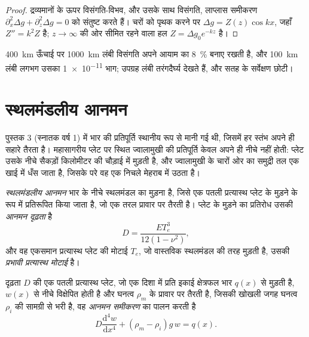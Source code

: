 \begin{proof}
द्रव्यमानों के ऊपर विसंगति-विभव, और उसके साथ विसंगति, लाप्लास
समीकरण $\partial_x^2\Delta g + \partial_z^2\Delta g = 0$ को संतुष्ट करते हैं। चरों को पृथक करने पर
$\Delta g = Z(z)\cos kx$, जहाँ $Z'' = k^2Z$ है;
$z \to \infty$ की ओर सीमित रहने वाला हल $Z = \Delta g_0e^{-kz}$ है।
\end{proof}

\qty{400}{km} ऊँचाई पर \qty{1000}{km} लंबी विसंगति अपने आयाम का \qty{8}{\percent}
बनाए रखती है, और \qty{100}{km} लंबी लगभग उसका \num{1e-11} भाग;
उपग्रह लंबी तरंगदैर्घ्य देखते हैं, और सतह के सर्वेक्षण छोटी।

\section{स्थलमंडलीय आनमन}

पुस्तक 3 (स्नातक वर्ष 1) में भार की प्रतिपूर्ति स्थानीय रूप से मानी गई थी, जिसमें हर स्तंभ अपने ही सहारे तैरता है।
महासागरीय प्लेट पर स्थित ज्वालामुखी की प्रतिपूर्ति केवल अपने ही नीचे नहीं होती:
प्लेट उसके नीचे सैकड़ों किलोमीटर की चौड़ाई में मुड़ती है, और ज्वालामुखी के चारों ओर का समुद्री तल
एक खाई में धँस जाता है, जिसके परे वह एक निचले मेहराब में उठता है।

\begin{definition}\label{def:b3:gravity-geodesy:flexure}
\emph{स्थलमंडलीय आनमन} भार के नीचे स्थलमंडल का मुड़ना है,
जिसे एक पतली प्रत्यास्थ प्लेट के मुड़ने के रूप में प्रतिरूपित किया जाता है,
जो एक तरल प्रावार पर तैरती है। प्लेट के मुड़ने का प्रतिरोध उसकी
\emph{आनमन दृढ़ता} है
\[
  D = \frac{ET_e^3}{12(1 - \nu^2)},
\]
और वह एकसमान प्रत्यास्थ प्लेट की मोटाई $T_e$, जो वास्तविक स्थलमंडल की तरह मुड़ती है,
उसकी \emph{प्रभावी प्रत्यास्थ मोटाई} है।
\end{definition}

\begin{theorem}\label{thm:b3:gravity-geodesy:plate}
दृढ़ता $D$ की एक पतली प्रत्यास्थ प्लेट, जो एक दिशा में प्रति इकाई क्षेत्रफल भार $q(x)$ से मुड़ती है,
$w(x)$ से नीचे विक्षेपित होती है और घनत्व $\rho_m$ के प्रावार पर तैरती है,
जिसकी खोखली जगह घनत्व $\rho_i$ की सामग्री से भरी है, वह
\emph{आनमन समीकरण} का पालन करती है
\[
  D\frac{\mathrm d^4w}{\mathrm dx^4} + (\rho_m - \rho_i)g\,w = q(x) .
\]
\end{theorem}

